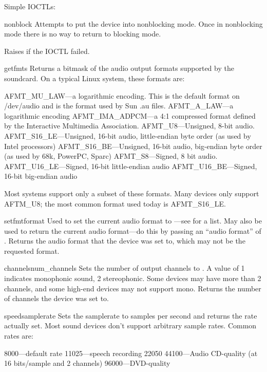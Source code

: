 Simple IOCTLs:

\begin{methoddesc}{nonblock}{}
Attempts to put the device into nonblocking mode.  Once in nonblocking
mode there is no way to return to blocking mode.

Raises  if the IOCTL failed.
\end{methoddesc}

\begin{methoddesc}{getfmts}{}
Returns a bitmask of the audio output formats supported by the
soundcard.  On a typical Linux system, these formats are:

AFMT_MU_LAW---a logarithmic encoding.  This is the default format on
/dev/audio and is the format used by Sun .au files.
AFMT_A_LAW---a logarithmic encoding
AFMT_IMA_ADPCM---a 4:1 compressed format defined by the Interactive
Multimedia Association.
AFMT_U8---Unsigned, 8-bit audio.
AFMT_S16_LE---Unsigned, 16-bit audio, little-endian byte order (as used
by Intel processors)
AFMT_S16_BE---Unsigned, 16-bit audio, big-endian byte order (as used by
68k, PowerPC, Sparc)
AFMT_S8---Signed, 8 bit audio.
AFMT_U16_LE---Signed, 16-bit little-endian audio
AFMT_U16_BE---Signed, 16-bit big-endian audio

Most systems support only a subset of these formats.  Many devices only
support AFTM_U8; the most common format used today is AFMT_S16_LE.
\end{methoddesc}

\begin{methoddesc}{setfmt}{format}
Used to set the current audio format to ---see
 for a list.  May also be used to return the current audio
format---do this by passing an ``audio format'' of .
Returns the audio format that the device was set to, which may not be
the requested format.
\end{methoddesc}

\begin{methoddesc}{channels}{num_channels}
Sets the number of output channels to .  A value of 1
indicates monophonic sound, 2 stereophonic.  Some devices may have more
than 2 channels, and some high-end devices may not support mono.
Returns the number of channels the device was set to.
\end{methoddesc}

\begin{methoddesc}{speed}{samplerate}
Sets the samplerate to  samples per second and returns
the rate actually set.  Most sound devices don't support arbitrary
sample rates.  Common rates are:

8000---default rate
11025---speech recording
22050
44100---Audio CD-quality (at 16 bits/sample and 2 channels)
96000---DVD-quality
\end{methoddesc}

